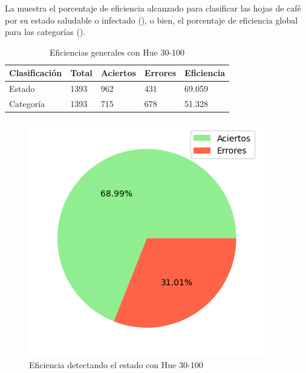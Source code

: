 La  muestra el porcentaje de eficiencia alcanzado para clasificar las hojas de café por su estado saludable o infectado (), o bien, el porcentaje de eficiencia global para las categorías ().

\begin{table}[h!]
\centering
\begin{tabular}{|l|l|l|l|l|}
\hline 
\textbf{Clasificación} & \textbf{Total} & \textbf{Aciertos} & \textbf{Errores} & \textbf{Eficiencia} \\
\hline
Estado & 1393 & 962 & 431 & 69.059 \\
\hline 
Categoría & 1393 & 715 & 678 & 51.328 \\
\hline 
\end{tabular}
\caption{Eficiencias generales con Hue 30-100}
\label{table:efficiency_general_30_100}
\end{table}

\captionsetup[figure]{skip=-10pt}

\begin{figure}[!ht]
\centering
\includegraphics[scale=0.6]{images/result_global_state_30_100.png}
\caption{Eficiencia detectando el estado con Hue 30-100}
\label{img:efficiency_state_30_100}
\end{figure}

